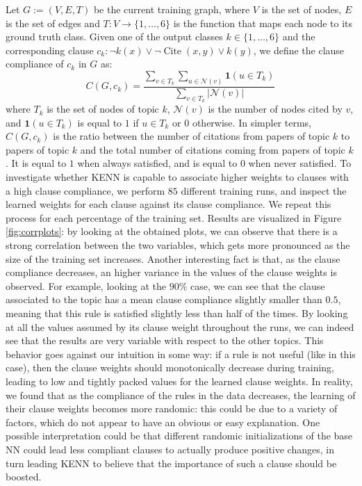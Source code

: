 \begin{definition}
	Let $G:=(V,E,T)$ be the current training graph, where $V$ is the set of nodes, $E$ is the set of edges and $T:V\rightarrow \{1,\dots,6\}$ is the function that maps each node to its ground truth class.
	Given one of the output classes $k\in\{1,\dots,6\}$ and the corresponding clause $c_k: \neg k(x) \vee \neg \operatorname{Cite}(x,y) \vee k(y)$, we define the clause compliance of $c_k$ in $G$ as:
	\begin{equation}
	 C(G,c_k) = \frac{\sum_{v \in T_k} \sum_{u \in \mathcal{N}(v)}\mathbf{1}(u\in T_k)}{\sum_{v\in T_k}|\mathcal{N}(v)|}
	\end{equation}
	where $T_k$ is the set of nodes of topic $k$, $\mathcal{N}(v)$ is the number of nodes cited by $v$, and $\mathbf{1}(u\in T_k)$ is equal to $1$ if $u\in T_k$ or $0$ otherwise. In simpler terms, $C(G,c_k)$ is the ratio between the number of citations from papers of topic $k$ to papers of topic $k$ and the total number of citations coming from papers of topic $k$. It is equal to $1$ when always satisfied, and is equal to $0$ when never satisfied. To investigate whether KENN is capable to associate higher weights to clauses with a high clause compliance, we perform $85$ different training runs, and inspect the learned weights for each clause against its clause compliance. We repeat this process for each percentage of the training set. Results are visualized in Figure \ref{fig:corrplots}: by looking at the obtained plots, we can observe that there is a strong correlation between the two variables, which gets more pronounced as the size of the training set increases. Another interesting fact is that, as the clause compliance decreases, an higher variance in the values of the clause weights is observed. For example, looking at the $90\%$ case, we can see that the clause associated to the topic  has a mean clause compliance slightly smaller than $0.5$, meaning that this rule is satisfied slightly less than half of the times. By looking at all the values assumed by its clause weight throughout the runs, we can indeed see that the results are very variable with respect to the other topics. This behavior goes against our intuition in some way: if a rule is not useful (like in this case), then the clause weights should monotonically decrease during training, leading to low and tightly packed values for the learned clause weights. In reality, we found that as the compliance of the rules in the data decreases, the learning of their clause weights becomes more randomic: this could be due to a variety of factors, which do not appear to have an obvious or easy explanation. One possible interpretation could be that different randomic initializations of the base NN could lead less compliant clauses to actually produce positive changes, in turn leading KENN to believe that the importance of such a clause should be boosted.
\end{definition}

